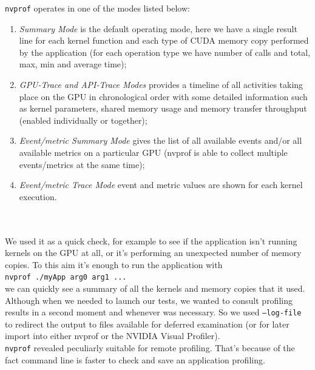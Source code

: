 	
	\texttt{nvprof} operates in one of the modes listed below:
	
	 \begin{enumerate}
	 \item \textit{Summary Mode} is the default operating mode, here we have a single result line for each kernel function and each type of CUDA memory copy performed by the application (for each operation type we have number of calls and total, max, min and average time); 
	 
	 \item \textit{GPU-Trace and API-Trace Modes} provides a timeline of all activities taking place on the GPU in chronological order with some detailed information such as kernel parameters, shared memory usage and memory transfer throughput (enabled individually or together);
	 
	 
	 \item \textit{Event/metric Summary Mode} gives the list of all available events and/or all available metrics on a particular GPU (nvprof is able to collect multiple events/metrics at the same time);
	 
	 \item \textit{Event/metric Trace Mode} event and metric values are shown for each kernel execution.  
	
\end{enumerate} 
	
	\cite{profilersguide}\\\\
	
	We used it as a quick check, for example to see if the application isn't running kernels on the GPU at all, or it's performing an unexpected number of memory copies.
	To this aim it's enough to run the application with\\
	\texttt{nvprof ./myApp arg0 arg1 ...}\\
	we can quickly see a summary of all the kernels and memory copies that it used.\\
	
	Although when we needed to launch our tests, we wanted to consult profiling results in a second moment and whenever was necessary. So we used \texttt{--log-file} to redirect the output to files available for deferred examination (or for later import into either nvprof or the NVIDIA Visual Profiler). \\
	
	\texttt{nvprof} revealed peculiarly suitable for remote profiling. That's because of the fact command line is faster to check and save an application profiling.
	  

